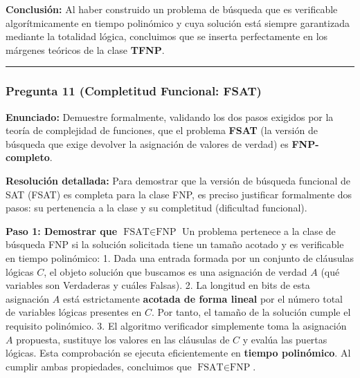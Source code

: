 \documentclass[12pt]{book} %
\begin{document}
\textbf{Conclusión:} Al haber construido un problema de búsqueda que es
verificable algorítmicamente en tiempo polinómico y cuya solución está
siempre garantizada mediante la totalidad lógica, concluimos que se
inserta perfectamente en los márgenes teóricos de la clase
\textbf{TFNP}.

\begin{center}\rule{0.5\linewidth}{0.5pt}\end{center}

\hypertarget{pregunta-11-completitud-funcional-fsat}{%
\subsubsection{Pregunta 11 (Completitud Funcional:
FSAT)}\label{pregunta-11-completitud-funcional-fsat}}

\textbf{Enunciado:} Demuestre formalmente, validando los dos pasos
exigidos por la teoría de complejidad de funciones, que el problema
\textbf{FSAT} (la versión de búsqueda que exige devolver la asignación
de valores de verdad) es \textbf{FNP-completo}.

\textbf{Resolución detallada:} Para demostrar que la versión de búsqueda
funcional de SAT (FSAT) es completa para la clase FNP, es preciso
justificar formalmente dos pasos: su pertenencia a la clase y su
completitud (dificultad funcional).

\textbf{Paso 1: Demostrar que \(\text{FSAT} \in \text{FNP}\)} Un
problema pertenece a la clase de búsqueda FNP si la solución solicitada
tiene un tamaño acotado y es verificable en tiempo polinómico: 1. Dada
una entrada formada por un conjunto de cláusulas lógicas \(C\), el
objeto solución que buscamos es una asignación de verdad \(A\) (qué
variables son Verdaderas y cuáles Falsas). 2. La longitud en bits de
esta asignación \(A\) está estrictamente \textbf{acotada de forma
lineal} por el número total de variables lógicas presentes en \(C\). Por
tanto, el tamaño de la solución cumple el requisito polinómico. 3. El
algoritmo verificador simplemente toma la asignación \(A\) propuesta,
sustituye los valores en las cláusulas de \(C\) y evalúa las puertas
lógicas. Esta comprobación se ejecuta eficientemente en \textbf{tiempo
polinómico}. Al cumplir ambas propiedades, concluimos que
\(\text{FSAT} \in \text{FNP}\).
\end{document}
